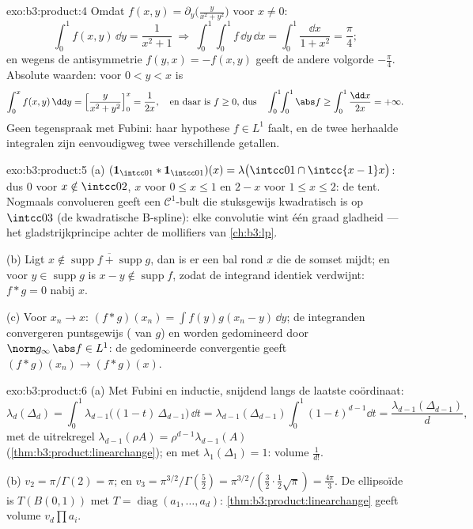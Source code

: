 \begin{solution}{exo:b3:product:4}
Omdat $f(x,y) = \partial_y\bigl(\frac{y}{x^2+y^2}\bigr)$ voor $x
\ne 0$:
\[
\int_0^1 f(x, y)\,\dd y = \frac{1}{x^2 + 1}
\ \Longrightarrow\
\int_0^1\!\!\int_0^1 f\,\dd y\,\dd x =
\int_0^1\frac{\dd x}{1 + x^2} = \frac\pi4 ;
\]
en wegens de antisymmetrie $f(y,x) = -f(x,y)$ geeft de andere
volgorde $-\frac\pi4$. Absolute waarden: voor $0 < y < x$ is
\[
\int_0^x f(x,y)\,\dd y = \Bigl[\frac{y}{x^2 +
y^2}\Bigr]_0^x = \frac1{2x},
\quad\text{en daar is } f \geq 0 \text{, dus}\quad
\int_0^1\!\!\int_0^1\abs f \geq \int_0^1\frac{\dd x}{2x} =
+\infty .
\]
Geen tegenspraak met Fubini: haar hypothese $f \in L^1$ faalt, en
de twee herhaalde integralen zijn eenvoudigweg twee verschillende
getallen.
\end{solution}

\begin{solution}{exo:b3:product:5}
(a) $(\mathbf 1_{\intcc01}*\mathbf 1_{\intcc01})(x) =
\lambda\bigl(\intcc01\cap\intcc{x-1}x\bigr)$: dus $0$ voor $x
\notin \intcc02$, $x$ voor $0 \leq x \leq 1$ en $2 - x$ voor $1
\leq x \leq 2$: de tent. Nogmaals convolueren geeft een
$\mathcal C^1$-bult die stuksgewijs kwadratisch is op $\intcc03$
(de kwadratische B-spline): elke convolutie wint één graad
gladheid --- het gladstrijkprincipe achter de mollifiers van
\cref{ch:b3:lp}.

(b) Ligt $x \notin \overline{\operatorname{supp}f +
\operatorname{supp}g}$, dan is er een bal rond $x$ die de somset
mijdt; en voor $y \in \operatorname{supp}g$ is $x - y \notin
\operatorname{supp}f$, zodat de integrand identiek verdwijnt: $f
* g = 0$ nabij $x$.

(c) Voor $x_n \to x$: $(f*g)(x_n) = \int f(y)g(x_n - y)\,\dd y$;
de integranden convergeren puntsgewijs ( van $g$) en
worden gedomineerd door $\norm g_\infty\,\abs f \in L^1$: de
gedomineerde convergentie geeft $(f*g)(x_n) \to (f*g)(x)$.
\end{solution}

\begin{solution}{exo:b3:product:6}
(a) Met Fubini en inductie, snijdend langs de laatste coördinaat:
\[
\lambda_d(\Delta_d) = \int_0^1
\lambda_{d-1}\bigl((1 - t)\,\Delta_{d-1}\bigr)\,\dd t
= \lambda_{d-1}(\Delta_{d-1})\int_0^1(1 - t)^{d-1}\dd t
= \frac{\lambda_{d-1}(\Delta_{d-1})}{d},
\]
met de uitrekregel $\lambda_{d-1}(\rho A) =
\rho^{d-1}\lambda_{d-1}(A)$
(\cref{thm:b3:product:linearchange}); en met
$\lambda_1(\Delta_1) = 1$: volume $\frac1{d!}$.

(b) $v_2 = \pi/\Gamma(2) = \pi$; en $v_3 = \pi^{3/2}/\Gamma(\frac
52) = \pi^{3/2}/(\frac32\cdot\frac12 \sqrt\pi) = \frac{4\pi}3$. De
ellipsoïde is $T(B(0,1))$ met $T = \operatorname{diag}(a_1, \dots,
a_d)$: \cref{thm:b3:product:linearchange} geeft volume
$v_d\prod a_i$.
\end{solution}

